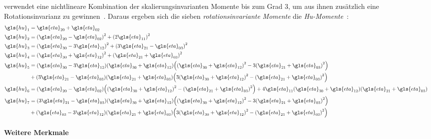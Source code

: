 \citeauthor{Hu} verwendet eine nichtlineare Kombination der skalierungsinvarianten Momente bis zum Grad $3$, um aus ihnen zusätzlich eine Rotationsinvarianz zu gewinnen~\cite{Hu, momente}.
Daraus ergeben sich die sieben \emph{rotationsinvariante Momente} \bzw{} die \emph{Hu-Momente}~\cite{momente}:
\begin{equation*}
\begin{split}
  \gls{hu}_1 & = \gls{eta}_{20} + \gls{eta}_{02}\\
  \gls{hu}_2 & = {\left(\gls{eta}_{20} - \gls{eta}_{02}\right)}^2 + {\left(2\gls{eta}_{11}\right)}^2\\
  \gls{hu}_3 & = {\left(\gls{eta}_{30} - 3\gls{eta}_{12}\right)}^2 + {\left(3\gls{eta}_{21} - \gls{eta}_{03}\right)}^2\\
  \gls{hu}_4 & = {\left(\gls{eta}_{30} + \gls{eta}_{12}\right)}^2 + {\left(\gls{eta}_{21} + \gls{eta}_{03}\right)}^2\\
  \gls{hu}_5 & = \left(\gls{eta}_{30} - 3\gls{eta}_{12}\right)\left(\gls{eta}_{30} + \gls{eta}_{12}\right) \left({\left(\gls{eta}_{30} + \gls{eta}_{12}\right)}^2 - 3{\left(\gls{eta}_{21} + \gls{eta}_{03}\right)}^2\right)\\
  & + \left(3\gls{eta}_{21} - \gls{eta}_{03}\right)\left(\gls{eta}_{21} + \gls{eta}_{03}\right) \left(3{\left(\gls{eta}_{30} + \gls{eta}_{12}\right)}^2 - {\left(\gls{eta}_{21} + \gls{eta}_{03}\right)}^2\right)\\
  \gls{hu}_6 & = \left(\gls{eta}_{20} - \gls{eta}_{02}\right)\left({\left(\gls{eta}_{30} + \gls{eta}_{12}\right)}^2 - {\left(\gls{eta}_{21} + \gls{eta}_{03}\right)}^2\right) + 4\gls{eta}_{11}\left(\gls{eta}_{30} + \gls{eta}_{12}\right)\left(\gls{eta}_{21} + \gls{eta}_{03}\right)\\
  \gls{hu}_7 & = \left(3\gls{eta}_{21} - \gls{eta}_{03}\right)\left(\gls{eta}_{30} + \gls{eta}_{12}\right) \left({\left(\gls{eta}_{30} + \gls{eta}_{12}\right)}^2 - 3{\left(\gls{eta}_{21} + \gls{eta}_{03}\right)}^2\right)\\
  & + \left(\gls{eta}_{03} - 3\gls{eta}_{12}\right)\left(\gls{eta}_{21} + \gls{eta}_{03}\right) \left(3{\left(\gls{eta}_{30} + \gls{eta}_{12}\right)}^2 - {\left(\gls{eta}_{21} + \gls{eta}_{03}\right)}^2\right)
\end{split}
\end{equation*}

\paragraph{Weitere Merkmale}
\label{weitere_merkmale}

